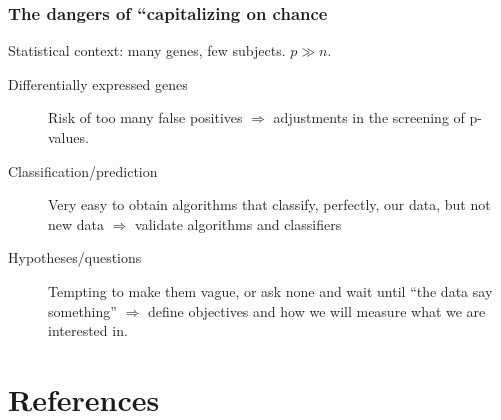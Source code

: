 \begin{frame}
\frametitle{The dangers of ``capitalizing on chance}

Statistical context: many genes, few subjects. $p \gg n$.



\begin{description}
\item[Differentially expressed genes] Risk of too many false positives
  $\Rightarrow$ adjustments in the screening of p-values.
  
  
  \vspace*{20pt}
\item[Classification/prediction] Very easy to obtain algorithms that
  classify, perfectly, our data, but not new data
  $\Rightarrow$ validate algorithms and classifiers
  
  
  \vspace*{20pt}
\item[Hypotheses/questions] Tempting to make them vague, or ask none and
  wait until ``the data say something'' $\Rightarrow$ define objectives
  and how we will measure what we are interested in.
  
  
\end{description}
\end{frame}



\section{References}

